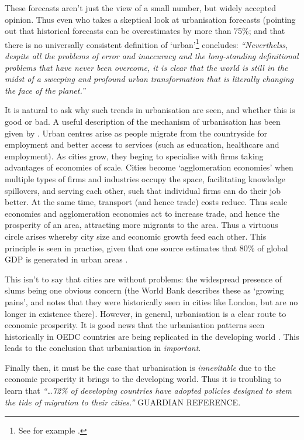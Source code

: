 These forecasts aren't just the view of a small number, but widely accepted opinion. Thus even \citet{Cohen2004} who takes a skeptical look at urbanisation forecasts (pointing out that historical forecasts can be overestimates by more than 75\%; and that there is no universally consistent definition of `urban'\footnote{See for example \citet{DepartmentforCommunitiesandLocalGovernment2006}.} concludes: \emph{``Neverthelss, despite all the problems of error and inaccuracy and the long-standing definitional problems that have never been overcome, it is clear that the world is still in the midst of a sweeping and profound urban transformation that is literally changing the face of the planet.''}

It is natural to ask why such trends in urbanisation are seen, and whether this is good or bad. A useful description of the mechanism of urbanisation has been given by \citet{WorldBank2008a}. Urban centres arise as people migrate from the countryside for employment and better access to services (such as education, healthcare and employment). As cities grow, they beging to specialise with firms taking advantages of economies of scale. Cities become `agglomeration economies' when multiple types of firms and industries occupy the space, facilitating knowledge spillovers, and serving each other, such that individual firms can do their job better. At the same time, transport (and hence trade) costs reduce. Thus scale economies and agglomeration economies act to increase trade, and hence the prosperity of an area, attracting more migrants to the area. Thus a virtuous circle arises whereby city size and economic growth feed each other. This principle is seen in practise, given that one source estimates that 80\% of global GDP is generated in urban areas \citep{AREAS2012}.

This isn't to say that cities are without problems: the widespread presence of slums being one obvious concern (the World Bank describes these as `growing pains', and notes that they were historically seen in cities like London, but are no longer in existence there). However, in general, urbanisation is a clear route to economic prosperity. It is good news that the urbanisation patterns seen historically in OEDC countries are being replicated in the developing world \citep{WorldBank2008a}. This leads to the conclusion that urbanisation in \emph{important}.

Finally then, it must be the case that urbanisation is \emph{innevitable} due to the economic prosperity it brings to the developing world. Thus it is troubling to learn that \emph{``\ldots 72\% of developing countries have adopted policies designed to stem the tide of migration to their cities.''} GUARDIAN REFERENCE.

